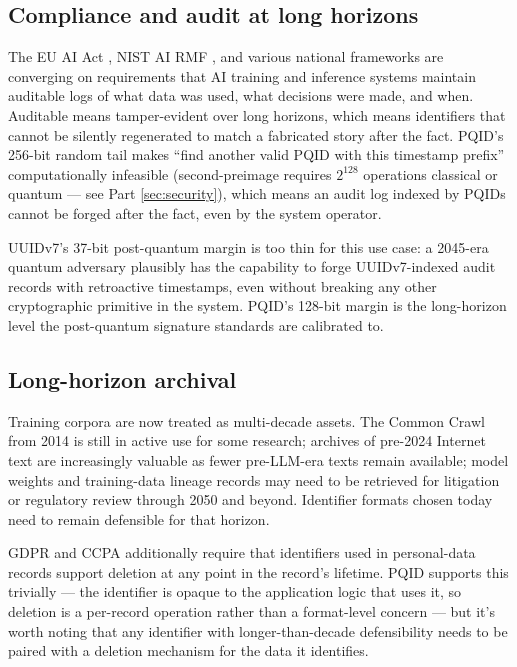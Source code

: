 \subsection{Compliance and audit at long horizons}

The EU AI Act \citep{euaiact}, NIST AI RMF \citep{nistairmf}, and various national frameworks are converging on requirements that AI training and inference systems maintain auditable logs of what data was used, what decisions were made, and when. Auditable means tamper-evident over long horizons, which means identifiers that cannot be silently regenerated to match a fabricated story after the fact. PQID's 256-bit random tail makes ``find another valid PQID with this timestamp prefix'' computationally infeasible (second-preimage requires $2^{128}$ operations classical or quantum --- see Part \ref{sec:security}), which means an audit log indexed by PQIDs cannot be forged after the fact, even by the system operator.

UUIDv7's 37-bit post-quantum margin is too thin for this use case: a 2045-era quantum adversary plausibly has the capability to forge UUIDv7-indexed audit records with retroactive timestamps, even without breaking any other cryptographic primitive in the system. PQID's 128-bit margin is the long-horizon level the post-quantum signature standards are calibrated to.

\subsection{Long-horizon archival}

Training corpora are now treated as multi-decade assets. The Common Crawl \citep{commoncrawl} from 2014 is still in active use for some research; archives of pre-2024 Internet text are increasingly valuable as fewer pre-LLM-era texts remain available; model weights and training-data lineage records may need to be retrieved for litigation or regulatory review through 2050 and beyond. Identifier formats chosen today need to remain defensible for that horizon.

GDPR \citep{gdpr} and CCPA \citep{ccpa} additionally require that identifiers used in personal-data records support deletion at any point in the record's lifetime. PQID supports this trivially --- the identifier is opaque to the application logic that uses it, so deletion is a per-record operation rather than a format-level concern --- but it's worth noting that any identifier with longer-than-decade defensibility needs to be paired with a deletion mechanism for the data it identifies.

